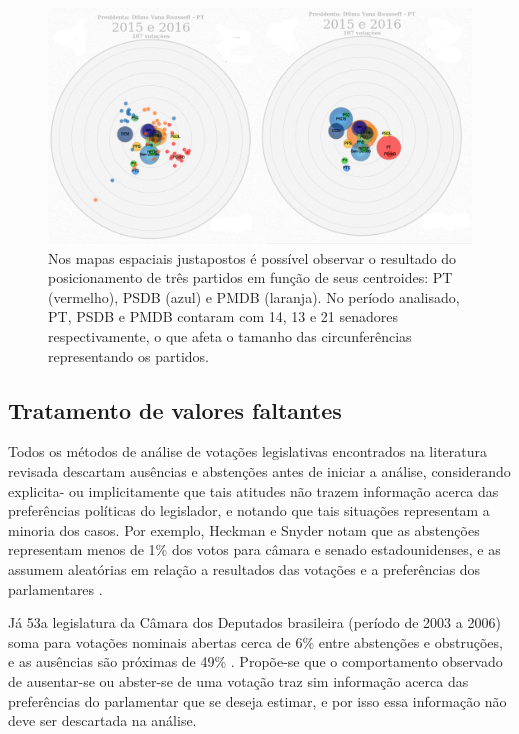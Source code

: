 \documentclass[a4paper, 12pt]{article}
\newcommand\todo[1]{\nb{ToDo}{#1}}
\begin{document}
\begin{figure}[h]
  \centering
  \includegraphics[scale=0.37]{figs/centroide.png}
  \caption{Nos mapas espaciais justapostos é possível observar o resultado do posicionamento de três partidos em função de seus centroides: PT (vermelho), PSDB (azul) e PMDB (laranja). No período analisado, PT, PSDB e PMDB contaram com 14, 13 e 21 senadores respectivamente, o que afeta o tamanho das circunferências representando os partidos.}
  \label{fig:centroide}
\end{figure}

\subsection*{Tratamento de valores faltantes}

Todos os métodos de análise de votações legislativas encontrados na literatura revisada descartam ausências e abstenções antes de iniciar a análise, considerando explicita- ou implicitamente que tais atitudes não trazem informação acerca das preferências políticas do legislador, e notando que tais situações representam a minoria dos casos. Por exemplo, Heckman e Snyder notam que as abstenções representam menos de 1\% dos votos para câmara e senado estadounidenses, e as assumem aleatórias em relação a resultados das votações e a preferências dos parlamentares \cite[p.40]{heckman-snyder1997}.

Já 53a legislatura da Câmara dos Deputados brasileira (período de 2003 a 2006) soma para votações nominais abertas cerca de 6\% entre abstenções e obstruções, e as ausências são próximas de 49\% \todo{citar fonte}. Propõe-se que o comportamento observado de ausentar-se ou abster-se de uma votação traz sim informação acerca das preferências do parlamentar que se deseja estimar, e por isso essa informação não deve ser descartada na análise.
\end{document}

